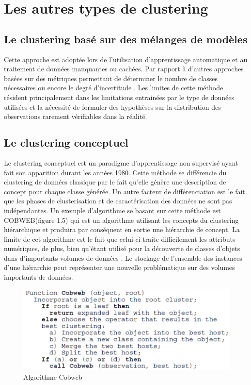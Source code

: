 \documentclass[memoire.tex]{subfiles}
\begin{document}
\section{Les autres types de clustering}
\subsection{Le clustering basé sur des mélanges de modèles}
Cette approche est adoptée lors de l'utilisation d'apprentissage automatique et au traitement de données manquantes ou cachées. Par rapport à d'autres approches basées sur des métriques permettant de déterminer le nombre de classes nécessaires  ou encore  le degré d'incertitude \cite{ref10}. Les limites de cette méthode résident principalement dans les limitations entrainées par le type de données utilisées et la nécessité de formuler des hypothèses sur la distribution des observations rarement vérifiables dans la réalité.\cite{ref8}

\subsection{Le clustering conceptuel}
Le clustering conceptuel est un paradigme d'apprentissage non supervisé ayant fait son apparition durant les années 1980. Cette méthode se différencie du clustering de données classique par le fait qu'elle génère une description de concept pour chaque classe générée. Un autre facteur de différenciation est le fait que les phases de clusterisation et de caractérisation des données ne sont pas indépendantes.\cite{ref11}
Un exemple d’algorithme se basant sur cette méthode est COBWEB(figure 1.5) qui est un algorithme utilisant les concepts du clustering hiérarchique et produira par conséquent en sortie une hiérarchie de concept. 
La limite de cet algorithme est le fait que celui-ci traite difficilement les attributs numériques\cite{ref8}, de plus, bien qu’étant utilisé pour la découverte de classes d’objets dans d’importants volumes de données 
\cite{ref14}. Le stockage de l'ensemble des instances d’une hiérarchie peut représenter une nouvelle problématique sur des volumes importants de données.
	\begin{figure}[h!]
		\centerline{\includegraphics[scale=0.7]{img/cobweb.png}}
		\caption{Algorithme Cobweb}
	\end{figure}
\end{document}
